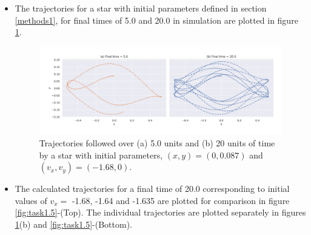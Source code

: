\documentclass[a4paper]{article}
\begin{document}
\begin{itemize}
			\item The trajectories for a star with initial parameters defined in section \ref{methods1}, for final times of 5.0 and 20.0 in simulation are plotted in figure \ref{fig:task1.4}. 
			
			\begin{figure} 
				\includegraphics[width=\columnwidth]{../task1/q4-trajectory/plots/q4.jpg}
				\caption{Trajectories followed over (a) 5.0 units and (b) 20 units of time by a star with initial parameters, \((x,y)=(0,0.087)\) and \((v_x,v_y)=(-1.68,0)\).}
				\label{fig:task1.4}
			\end{figure}
			
			\item The calculated trajectories for a final time of 20.0 corresponding to initial values of \(v_x = \) -1.68, -1.64 and -1.635 are plotted for comparison in figure \ref{fig:task1.5}-(Top). The individual trajectories are plotted separately in figures \ref{fig:task1.4}(b) and \ref{fig:task1.5}-(Bottom). 
			

\end{itemize}
\end{document}
